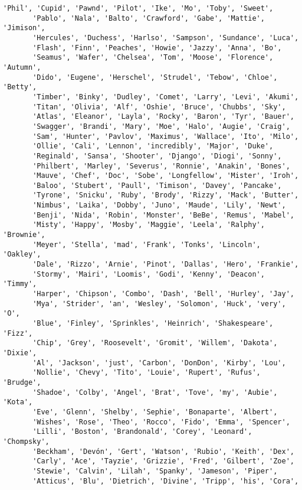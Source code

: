 \documentclass[11pt]{article}
\begin{document}
\begin{tcolorbox}[breakable, size=fbox, boxrule=.5pt, pad at break*=1mm, opacityfill=0]
\begin{Verbatim}[commandchars=\\\{\}]
       'Phil', 'Cupid', 'Pawnd', 'Pilot', 'Ike', 'Mo', 'Toby', 'Sweet',
       'Pablo', 'Nala', 'Balto', 'Crawford', 'Gabe', 'Mattie', 'Jimison',
       'Hercules', 'Duchess', 'Harlso', 'Sampson', 'Sundance', 'Luca',
       'Flash', 'Finn', 'Peaches', 'Howie', 'Jazzy', 'Anna', 'Bo',
       'Seamus', 'Wafer', 'Chelsea', 'Tom', 'Moose', 'Florence', 'Autumn',
       'Dido', 'Eugene', 'Herschel', 'Strudel', 'Tebow', 'Chloe', 'Betty',
       'Timber', 'Binky', 'Dudley', 'Comet', 'Larry', 'Levi', 'Akumi',
       'Titan', 'Olivia', 'Alf', 'Oshie', 'Bruce', 'Chubbs', 'Sky',
       'Atlas', 'Eleanor', 'Layla', 'Rocky', 'Baron', 'Tyr', 'Bauer',
       'Swagger', 'Brandi', 'Mary', 'Moe', 'Halo', 'Augie', 'Craig',
       'Sam', 'Hunter', 'Pavlov', 'Maximus', 'Wallace', 'Ito', 'Milo',
       'Ollie', 'Cali', 'Lennon', 'incredibly', 'Major', 'Duke',
       'Reginald', 'Sansa', 'Shooter', 'Django', 'Diogi', 'Sonny',
       'Philbert', 'Marley', 'Severus', 'Ronnie', 'Anakin', 'Bones',
       'Mauve', 'Chef', 'Doc', 'Sobe', 'Longfellow', 'Mister', 'Iroh',
       'Baloo', 'Stubert', 'Paull', 'Timison', 'Davey', 'Pancake',
       'Tyrone', 'Snicku', 'Ruby', 'Brody', 'Rizzy', 'Mack', 'Butter',
       'Nimbus', 'Laika', 'Dobby', 'Juno', 'Maude', 'Lily', 'Newt',
       'Benji', 'Nida', 'Robin', 'Monster', 'BeBe', 'Remus', 'Mabel',
       'Misty', 'Happy', 'Mosby', 'Maggie', 'Leela', 'Ralphy', 'Brownie',
       'Meyer', 'Stella', 'mad', 'Frank', 'Tonks', 'Lincoln', 'Oakley',
       'Dale', 'Rizzo', 'Arnie', 'Pinot', 'Dallas', 'Hero', 'Frankie',
       'Stormy', 'Mairi', 'Loomis', 'Godi', 'Kenny', 'Deacon', 'Timmy',
       'Harper', 'Chipson', 'Combo', 'Dash', 'Bell', 'Hurley', 'Jay',
       'Mya', 'Strider', 'an', 'Wesley', 'Solomon', 'Huck', 'very', 'O',
       'Blue', 'Finley', 'Sprinkles', 'Heinrich', 'Shakespeare', 'Fizz',
       'Chip', 'Grey', 'Roosevelt', 'Gromit', 'Willem', 'Dakota', 'Dixie',
       'Al', 'Jackson', 'just', 'Carbon', 'DonDon', 'Kirby', 'Lou',
       'Nollie', 'Chevy', 'Tito', 'Louie', 'Rupert', 'Rufus', 'Brudge',
       'Shadoe', 'Colby', 'Angel', 'Brat', 'Tove', 'my', 'Aubie', 'Kota',
       'Eve', 'Glenn', 'Shelby', 'Sephie', 'Bonaparte', 'Albert',
       'Wishes', 'Rose', 'Theo', 'Rocco', 'Fido', 'Emma', 'Spencer',
       'Lilli', 'Boston', 'Brandonald', 'Corey', 'Leonard', 'Chompsky',
       'Beckham', 'Devón', 'Gert', 'Watson', 'Rubio', 'Keith', 'Dex',
       'Carly', 'Ace', 'Tayzie', 'Grizzie', 'Fred', 'Gilbert', 'Zoe',
       'Stewie', 'Calvin', 'Lilah', 'Spanky', 'Jameson', 'Piper',
       'Atticus', 'Blu', 'Dietrich', 'Divine', 'Tripp', 'his', 'Cora',

\end{Verbatim}
\end{tcolorbox}
\end{document}
